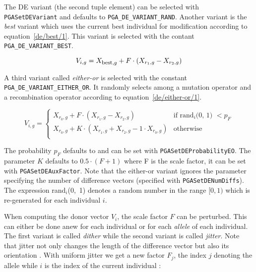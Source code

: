 \documentclass{report}
\begin{document}
The DE variant (the second tuple element) can be selected with
\verb+PGASetDEVariant+ and defaults to \verb+PGA_DE_VARIANT_RAND+.
Another variant is the \textit{best} variant which uses the current best
individual for modification according to equation~\ref{de/best/1}. This
variant is selected with the contant \verb+PGA_DE_VARIANT_BEST+.

\begin{equation}\label{de/best/1}
V_{i,g} = X_{\hbox{\footnotesize best},g} + F \cdot (X_{r_1,g} - X_{r_2,g})
\end{equation}

A third variant called \textit{either-or} \cite[p.~117]{PSL05} is
selected with the constant \verb+PGA_DE_VARIANT_EITHER_OR+. It randomly
selects among a mutation operator and a recombination operator according
to equation~\ref{de/either-or/1}.

\begin{equation}\label{de/either-or/1}
V_{i,g} = \left\{
    \begin{array}{ll}
    {X_{r_0,g} + F \cdot (X_{r_1,g} - X_{r_2,g})}
        & \mbox{if rand$_i$(0, 1) $< p_F$} \\
    {X_{r_0,g} + K \cdot (X_{r_1,g} + X_{r_2,g} - 1\cdot X_{r_0,g})}
        & \mbox{otherwise} \\
    \end{array} \right.
\end{equation}

The probability $p_F$ defaults to \DefaultDEProbabilityEO{} and can be
set with \verb+PGASetDEProbabilityEO+. The parameter $K$ defaults to
$0.5 \cdot (F + 1)$ \cite[p.~118]{PSL05} where F is the scale factor, it
can be set with \verb+PGASetDEAuxFactor+. Note that the either-or
variant ignores the parameter specifying the number of difference
vectors (specified with \verb+PGASetDENumDiffs+). The expression
rand$_i$(0,~1) denotes a random number in the range $[0, 1)$ which is
re-generated for each individual $i$.

When computing the donor vector $V_i$, the scale factor $F$ can be
perturbed. This can either be done anew for each individual or for each
\textit{allele} of each individual. The first variant is called
\textit{dither} while the
second variant is called \textit{jitter}.  Note that jitter not only
changes the length of the difference vector but also its orientation
\cite[p.~80]{PSL05}.  With uniform jitter we get a new factor $F_j$, the
index $j$ denoting the allele while $i$ is the index of the current
individual \cite[p.~80]{PSL05}:
\end{document}
